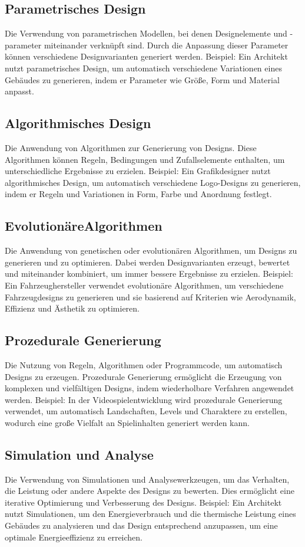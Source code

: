 \subsection*{Parametrisches Design}
Die Verwendung von parametrischen Modellen, bei denen Designelemente und -parameter miteinander verknüpft sind. Durch die Anpassung dieser Parameter können verschiedene Designvarianten generiert werden. Beispiel: Ein Architekt nutzt parametrisches Design, um automatisch verschiedene Variationen eines Gebäudes zu generieren, indem er Parameter wie Größe, Form und Material anpasst.

\subsection*{Algorithmisches Design}
Die Anwendung von Algorithmen zur Generierung von Designs. Diese Algorithmen können Regeln, Bedingungen und Zufallselemente enthalten, um unterschiedliche Ergebnisse zu erzielen. Beispiel: Ein Grafikdesigner nutzt algorithmisches Design, um automatisch verschiedene Logo-Designs zu generieren, indem er Regeln und Variationen in Form, Farbe und Anordnung festlegt.

\subsection*{EvolutionäreAlgorithmen}
Die Anwendung von genetischen oder evolutionären Algorithmen, um Designs zu generieren und zu optimieren. Dabei werden Designvarianten erzeugt, bewertet und miteinander kombiniert, um immer bessere Ergebnisse zu erzielen. Beispiel: Ein Fahrzeughersteller verwendet evolutionäre Algorithmen, um verschiedene Fahrzeugdesigns zu generieren und sie basierend auf Kriterien wie Aerodynamik, Effizienz und Ästhetik zu optimieren.

\subsection*{Prozedurale Generierung}
Die Nutzung von Regeln, Algorithmen oder Programmcode, um automatisch Designs zu erzeugen. Prozedurale Generierung ermöglicht die Erzeugung von komplexen und vielfältigen Designs, indem wiederholbare Verfahren angewendet werden. Beispiel: In der Videospielentwicklung wird prozedurale Generierung verwendet, um automatisch Landschaften, Levels und Charaktere zu erstellen, wodurch eine große Vielfalt an Spielinhalten generiert werden kann.

\subsection*{Simulation und Analyse}
Die Verwendung von Simulationen und Analysewerkzeugen, um das Verhalten, die Leistung oder andere Aspekte des Designs zu bewerten. Dies ermöglicht eine iterative Optimierung und Verbesserung des Designs. Beispiel: Ein Architekt nutzt Simulationen, um den Energieverbrauch und die thermische Leistung eines Gebäudes zu analysieren und das Design entsprechend anzupassen, um eine optimale Energieeffizienz zu erreichen.

